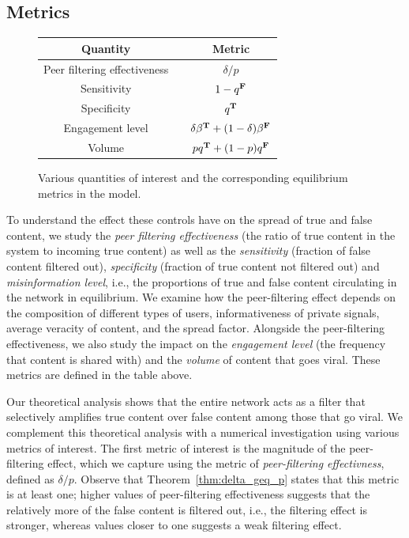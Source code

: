 \subsection{Metrics}
{\small 
\begin{figure}[htbp]
\centering
\begin{tabular}{ccc} 
  \toprule
 Quantity  & & Metric \\
 \midrule
 Peer filtering effectiveness &   & ${\delta}/{p}$ \\
  Sensitivity & & $1- q^{\mathbf{F}}$\\
 Specificity  & & $q^{\mathbf{T}}$\\
 Engagement level & & $\delta \beta^{\mathbf{T}} + (1-\delta) \beta^{\mathbf{F}}$\\
 Volume &  & $pq^{\mathbf{T}} + (1-p) q^{\mathbf{F}}$\\
  \bottomrule
\end{tabular}
\caption{Various quantities of interest and the corresponding equilibrium metrics in the model.}\label{table:metrics}


\end{figure} }
To understand the effect these controls have on the spread of true and false content, we  study the \emph{peer filtering effectiveness} (the ratio of true content in the system to incoming true content) as well as the \emph{sensitivity} (fraction of false content filtered out), \emph{specificity} (fraction of true content not filtered out) and \emph{misinformation  level}, i.e., the proportions of true and false content circulating in the network in equilibrium. We examine how the peer-filtering effect depends on the composition of different types of users, informativeness of private signals, average veracity of content, and the spread factor. Alongside the peer-filtering effectiveness, we also study the impact on the \emph{engagement level} (the frequency that content is shared with) and the \emph{volume} of content that goes viral. These metrics are defined in the table above. 


Our theoretical analysis shows that the entire network acts as a filter that selectively amplifies true content over false content among those that go viral. We  complement this theoretical analysis with a numerical investigation using various metrics of interest. The first metric of interest is the magnitude of the peer-filtering effect, which we capture using the metric of {\em peer-filtering effectivness}, defined as $\delta/p$. Observe that Theorem~\ref{thm:delta_geq_p} states that this metric is at least one; higher values of peer-filtering effectiveness suggests that the  relatively more of the false content is filtered out, i.e., the filtering effect is stronger, whereas values closer to one suggests a weak filtering effect. 

